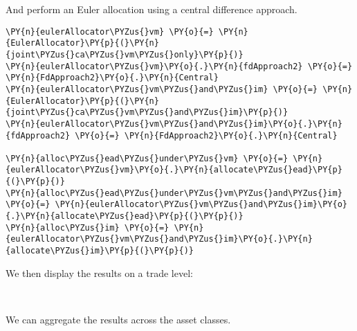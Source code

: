     And perform an Euler allocation using a central difference approach.

    \begin{tcolorbox}[breakable, size=fbox, boxrule=1pt, pad at break*=1mm,colback=cellbackground, colframe=cellborder]
\begin{Verbatim}[commandchars=\\\{\}]
\PY{n}{eulerAllocator\PYZus{}vm} \PY{o}{=} \PY{n}{EulerAllocator}\PY{p}{(}\PY{n}{joint\PYZus{}ca\PYZus{}vm\PYZus{}only}\PY{p}{)}
\PY{n}{eulerAllocator\PYZus{}vm}\PY{o}{.}\PY{n}{fdApproach2} \PY{o}{=} \PY{n}{FdApproach2}\PY{o}{.}\PY{n}{Central}
\PY{n}{eulerAllocator\PYZus{}vm\PYZus{}and\PYZus{}im} \PY{o}{=} \PY{n}{EulerAllocator}\PY{p}{(}\PY{n}{joint\PYZus{}ca\PYZus{}vm\PYZus{}and\PYZus{}im}\PY{p}{)}
\PY{n}{eulerAllocator\PYZus{}vm\PYZus{}and\PYZus{}im}\PY{o}{.}\PY{n}{fdApproach2} \PY{o}{=} \PY{n}{FdApproach2}\PY{o}{.}\PY{n}{Central}

\PY{n}{alloc\PYZus{}ead\PYZus{}under\PYZus{}vm} \PY{o}{=} \PY{n}{eulerAllocator\PYZus{}vm}\PY{o}{.}\PY{n}{allocate\PYZus{}ead}\PY{p}{(}\PY{p}{)}
\PY{n}{alloc\PYZus{}ead\PYZus{}under\PYZus{}vm\PYZus{}and\PYZus{}im} \PY{o}{=} \PY{n}{eulerAllocator\PYZus{}vm\PYZus{}and\PYZus{}im}\PY{o}{.}\PY{n}{allocate\PYZus{}ead}\PY{p}{(}\PY{p}{)}
\PY{n}{alloc\PYZus{}im} \PY{o}{=} \PY{n}{eulerAllocator\PYZus{}vm\PYZus{}and\PYZus{}im}\PY{o}{.}\PY{n}{allocate\PYZus{}im}\PY{p}{(}\PY{p}{)}
\end{Verbatim}
\end{tcolorbox}

    We then display the results on a trade level:

            \begin{tcolorbox}[breakable, size=fbox, boxrule=.5pt, pad at break*=1mm, opacityfill=0]
\begin{center}
    \end{center}
    { \hspace*{\fill} \\}
\end{tcolorbox}
        
    We can aggregate the results across the asset classes.

            \begin{tcolorbox}[breakable, size=fbox, boxrule=.5pt, pad at break*=1mm, opacityfill=0]
\begin{center}
    \end{center}
    { \hspace*{\fill} \\}
\end{tcolorbox}
        
